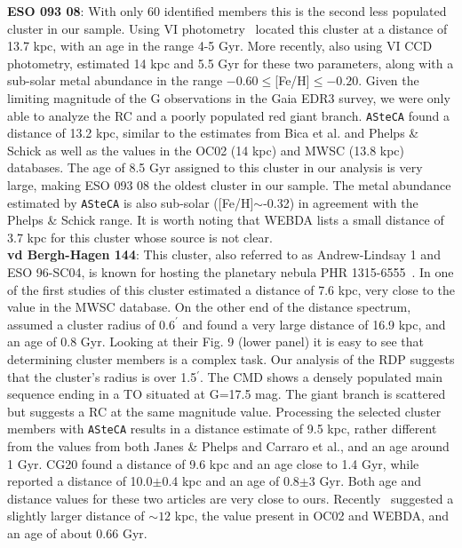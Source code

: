 \documentclass{aa}
\begin{document}
  \textbf{ESO 093 08}: With only 60 identified members this is the second less
  populated cluster in our sample. Using VI photometry~\cite{Bica_1999} located
  this cluster at a distance of 13.7 kpc, with an age in the range 4-5 Gyr.
  More recently, also using VI CCD photometry, \cite{Phelps_2003} estimated 14
  kpc and 5.5 Gyr for these two parameters, along with a sub-solar metal
  abundance in the range $-0.60\leq$[Fe/H]$\leq-0.20$.
  Given the limiting magnitude of the G observations in the Gaia EDR3 survey, we
  were only able to analyze the RC and a poorly populated red giant branch.
  \texttt{ASteCA} found a distance of 13.2 kpc, similar to the estimates from
  Bica et al. and Phelps \& Schick as well as the values in the OC02 (14 kpc)
  and MWSC (13.8 kpc) databases.
  The age of 8.5 Gyr assigned to this cluster in our analysis is very
  large, making ESO 093 08 the oldest cluster in our sample. The metal
  abundance estimated by \texttt{ASteCA} is also sub-solar ([Fe/H]$\sim$-0.32)
  in agreement with the Phelps \& Schick range. It is worth noting that WEBDA
  lists a small distance of 3.7 kpc for this cluster whose source is not
  clear.\\

  \textbf{vd Bergh-Hagen 144}: This cluster, also referred to as Andrew-Lindsay
  1 and ESO 96-SC04, is known for hosting the planetary nebula PHR
  1315-6555~\citep{Parker_2011}.
  In one of the first studies of this cluster\cite{Janes_1994} estimated a
  distance of 7.6 kpc, very close to the value in the MWSC database. On the
  other end of the distance spectrum,
  \cite{Carraro_2005_neglected} assumed a cluster radius of $0.6^{\prime}$ and
  found a very large distance of 16.9 kpc, and an age of 0.8 Gyr. Looking at
  their Fig. 9 (lower panel) it is easy to see that determining cluster members
  is a complex task. Our analysis of the RDP suggests that the cluster's radius
  is over 1.5$^{\prime}$. The CMD shows a densely populated main sequence ending
  in a TO situated at G=17.5 mag. The giant branch is scattered but suggests a
  RC at the same magnitude value.
  Processing the selected cluster members with \texttt{ASteCA} results in a
  distance estimate of 9.5 kpc, rather different from the values
  from both Janes \& Phelps and Carraro et al., and an age around 1 Gyr.
  CG20 found a distance of 9.6 kpc and an age close to 1.4 Gyr,
  while~\cite{Majaess_2014} reported a distance of 10.0$\pm$0.4 kpc and an
  age of 0.8$\pm$3 Gyr. Both age and distance values for these two articles are
  very close to ours. Recently~\cite{Fragkou_2019} suggested a slightly larger
  distance of $\sim12$ kpc, the value present in OC02 and WEBDA, and an age of
  about 0.66 Gyr.\\
\end{document}
